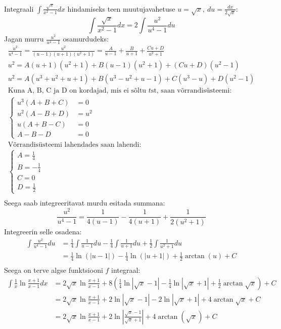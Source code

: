 \documentclass{article}
\begin{document}
Integraali $\int\frac{\sqrt{x}}{x^2-1}dx$ hindamiseks teen muutujavahetuse $u=\sqrt{x},\ du=\frac{dx}{2\sqrt{x}}$:
\begin{equation*}
\int\frac{\sqrt{x}}{x^2-1}dx=2\int\frac{u^2}{u^4-1}du
\end{equation*}
Jagan murru $\frac{u^2}{u^4-1}$ osamurdudeks:
\begin{gather*}
\frac{u^2}{u^4-1}=\frac{u^2}{(u-1)(u+1)(u^2+1)}=\frac{A}{u-1}+\frac{B}{u+1}+\frac{Cu+D}{u^2+1}\\
u^2=A(u+1)(u^2+1)+B(u-1)(u^2+1)+(Cu+D)(u^2-1)\\
u^2=A(u^3+u^2+u+1)+B(u^3-u^2+u-1)+C(u^3-u)+D(u^2-1)\\
\text{Kuna A, B, C ja D on kordajad, mis ei s\~oltu }t\text{st, saan v\~orrandis\"usteemi:}\\
\left\{
\begin{aligned}
u^3(A+B+C)&=0\\
u^2(A-B+D)&=u^2\\
u(A+B-C)&=0\\
A-B-D&=0
\end{aligned}
\right.\\
\text{V\~orrandis\"usteemi lahendades saan lahendi:}\\
\left\{
\begin{aligned}
A=\frac{1}{4}\\
B=-\frac{1}{4}\\
C=0\\
D=\frac{1}{2}
\end{aligned}
\right.\\
\end{gather*}
Seega saab integreeritavat murdu esitada summana:
\begin{equation*}
\frac{u^2}{u^4-1}=\frac{1}{4(u-1)}-\frac{1}{4(u+1)}+\frac{1}{2(u^2+1)}
\end{equation*}
Integreerin selle osadena:
\begin{equation*}
\begin{aligned}
\int\frac{u^2}{u^4-1}du&=\frac{1}{4}\int\frac{1}{u-1}du-\frac{1}{4}\int\frac{1}{u+1}du+\frac{1}{2}\int\frac{1}{u^2+1}du\\
&=\frac{1}{4}\ln(|u-1|)-\frac{1}{4}\ln(|u+1|)+\frac{1}{2}\arctan(u)+C\\
\end{aligned}
\end{equation*}
Seega on terve algse funktsiooni $f$ integraal:
\begin{equation*}
\begin{aligned}
\int\frac{1}{x}\ln\frac{x+1}{x-1}dx&=2\sqrt{x}\ln\frac{x+1}{x-1}+8\left(\frac{1}{4}\ln|\sqrt{x}-1|-\frac{1}{4}\ln|\sqrt{x}+1|+\frac{1}{2}\arctan\sqrt{x}\right)+C\\
&=2\sqrt{x}\ln\frac{x+1}{x-1}+2\ln|\sqrt{x}-1|-2\ln|\sqrt{x}+1|+4\arctan\sqrt{x}+C\\
&=2\sqrt{x}\ln\frac{x+1}{x-1}+2\ln\left|\frac{\sqrt{x}-1}{\sqrt{x}+1}\right|+4\arctan(\sqrt{x})+C\\
\end{aligned}
\end{equation*}
\end{document}

